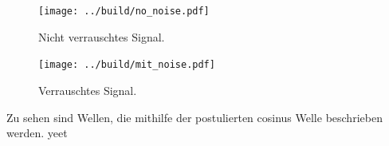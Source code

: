 \begin{figure}[H]
    \texttt{[image: ../build/no\_noise.pdf]}
    \caption{Nicht verrauschtes Signal.}
    \label{fig:fit_no_noise}
\end{figure}

\begin{figure}[H]
    \texttt{[image: ../build/mit\_noise.pdf]}
    \caption{Verrauschtes Signal.}
    \label{fig:fit_mit_noise}
\end{figure}

\noindent
Zu sehen sind Wellen, die mithilfe der postulierten cosinus Welle beschrieben werden. yeet


